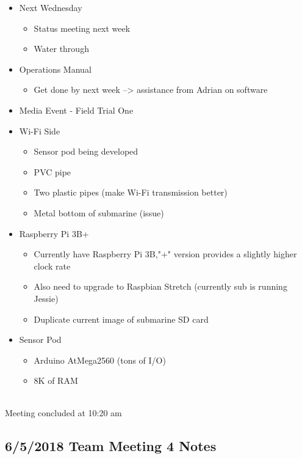 \documentclass[12pt]{article}
\begin{document}
			\noindent
			\begin{itemize}
				\item Next Wednesday
				\begin{itemize}
					\item Status meeting next week
					\item Water through
				\end{itemize}
				\item Operations Manual
				\begin{itemize}
					\item Get done by next week --> assistance from Adrian on software
				\end{itemize}
				\item Media Event - Field Trial One
				\item Wi-Fi Side
				\begin{itemize}
					\item Sensor pod being developed
					\item PVC pipe
					\item Two plastic pipes (make Wi-Fi transmission better)
					\item Metal bottom of submarine (issue)
				\end{itemize}
				\item Raspberry Pi 3B+
				\begin{itemize}
					\item Currently have Raspberry Pi 3B,"+" version provides a slightly higher clock rate
					\item Also need to upgrade to Raspbian Stretch (currently sub is running Jessie)
					\item Duplicate current image of submarine SD card
				\end{itemize}
				\item Sensor Pod
				\begin{itemize}
					\item Arduino AtMega2560 (tons of I/O)
					\item 8K of RAM
				\end{itemize}
			\end{itemize}
		
			\noindent
			\\Meeting concluded at 10:20 am
			
			\clearpage
	
	
		\subsection{6/5/2018 Team Meeting 4 Notes}
	
\end{document}
